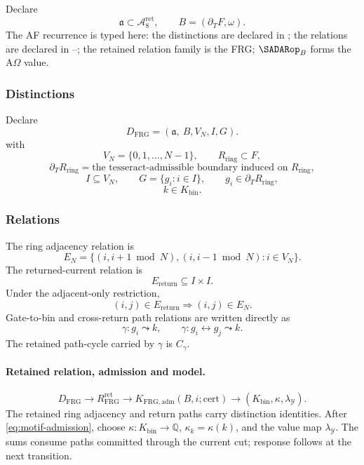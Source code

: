 Declare
\begin{equation}
\mathfrak a\subset \mathcal A^{\mathrm{ret}}_8,
\qquad
B=(\partial_TF,\omega).
\label{eq:frg-scope}
\end{equation}
The AF recurrence is typed here: the distinctions are declared in ; the relations are declared in --; the retained relation family is the FRG; \(\SADARop_B\) forms the A\(\Omega\) value.

\subsubsection{Distinctions}\label{subsec:frg-distinctions}
Declare
\begin{equation}
D_{\mathrm{FRG}}
=
(\mathfrak a,\ B,V_N,I,G).
\label{eq:frg-distinctions}
\end{equation}
with
\[
V_N=\{0,1,\ldots,N-1\},
\qquad
R_{\mathrm{ring}}\subset F,
\]
\[
\partial_T R_{\mathrm{ring}}
=
\text{the tesseract-admissible boundary induced on }R_{\mathrm{ring}},
\]
\[
I\subseteq V_N,
\qquad
G=\{g_i:i\in I\},
\qquad
g_i\in\partial_T R_{\mathrm{ring}},
\]
\[
k\in K_{\mathrm{bin}}.
\]

\subsubsection{Relations}\label{subsec:frg-relations}
The ring adjacency relation is
\begin{equation}
E_N=
\{(i,i+1\bmod N),(i,i-1\bmod N):i\in V_N\}.
\label{eq:frg-ring-adjacency}
\end{equation}
The returned-current relation is
\begin{equation}
E_{\mathrm{return}}\subseteq I\times I.
\label{eq:frg-return-relation}
\end{equation}
Under the adjacent-only restriction,
\begin{equation}
(i,j)\in E_{\mathrm{return}}
\Rightarrow
(i,j)\in E_N.
\label{eq:frg-adjacent-only-condition}
\end{equation}
Gate-to-bin and cross-return path relations are written directly as
\[
\gamma:g_i\leadsto k,
\qquad
\gamma:g_i\leftrightarrow g_j\leadsto k.
\]
The retained path-cycle carried by \(\gamma\) is \(C_\gamma\).

\paragraph{Retained relation, admission and model.}
\begin{equation}
D_{\mathrm{FRG}}\longrightarrow R^{\mathrm{ret}}_{\mathrm{FRG}}
\longrightarrow K_{\mathrm{FRG,adm}}(B,i;\mathrm{cert})
\longrightarrow(K_{\mathrm{bin}},\kappa,\lambda_{\mathcal Y}).
\label{eq:frg-admission-order}
\end{equation}
The retained ring adjacency and return paths carry distinction identities.
After \eqref{eq:motif-admission}, choose
\(\kappa:K_{\mathrm{bin}}\to\mathbb Q\), \(\kappa_k=\kappa(k)\), and the
value map \(\lambda_{\mathcal Y}\). The sums consume paths committed through
the current cut; response follows at the next transition.

